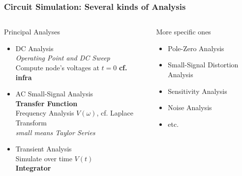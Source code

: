 \begin{frame}
  \frametitle{Circuit Simulation: Several kinds of Analysis}
  \begin{columns}
    \begin{column}[t]{.6\textwidth}
      Principal Analyses \\[1em]
      \begin{itemize}
      \item DC Analysis \\
        \textit{Operating Point and DC Sweep} \\
        Compute node's voltages at $t=0$
        \textbf{cf. infra} \\[1em]
      \item AC Small-Signal Analysis \\
        \textbf{Transfer Function} \\
        Frequency Analysis $V(\omega)$, cf. Laplace Transform \\
        \textit{small means Taylor Series} \\[1em]
      \item Transient Analysis \\
        Simulate over time $V(t)$ \\
        \textbf{Integrator}
      \end{itemize}
    \end{column}
    \begin{column}[t]{.4\textwidth}
      More specific ones \\[1em]
      \begin{itemize}
      \item Pole-Zero Analysis
      \item Small-Signal Distortion Analysis
      \item Sensitivity Analysis
      \item Noise Analysis
      \item etc.\@
      \end{itemize}
    \end{column}
  \end{columns}
\end{frame}

